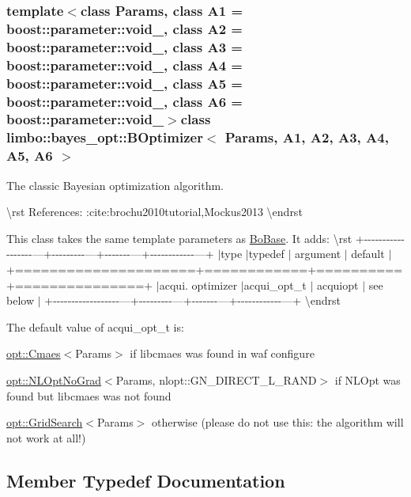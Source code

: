 \subsubsection*{template$<$class Params, class A1 = boost\+::parameter\+::void\+\_\+, class A2 = boost\+::parameter\+::void\+\_\+, class A3 = boost\+::parameter\+::void\+\_\+, class A4 = boost\+::parameter\+::void\+\_\+, class A5 = boost\+::parameter\+::void\+\_\+, class A6 = boost\+::parameter\+::void\+\_\+$>$class limbo\+::bayes\+\_\+opt\+::\+B\+Optimizer$<$ Params, A1, A2, A3, A4, A5, A6 $>$}

The classic Bayesian optimization algorithm.

\textbackslash{}rst References\+: \+:cite\+:{\ttfamily brochu2010tutorial,Mockus2013} \textbackslash{}endrst

This class takes the same template parameters as \hyperlink{classlimbo_1_1bayes__opt_1_1_bo_base}{Bo\+Base}. It adds\+: \textbackslash{}rst +-\/-\/-\/-\/-\/-\/-\/-\/-\/-\/-\/-\/-\/-\/-\/-\/-\/-\/---+-\/-\/-\/-\/-\/-\/-\/-\/-\/---+-\/-\/-\/-\/-\/-\/-\/---+-\/-\/-\/-\/-\/-\/-\/-\/-\/-\/-\/-\/---+ $\vert$type $\vert$typedef $\vert$ argument $\vert$ default $\vert$ +=====================+============+==========+===============+ $\vert$acqui. optimizer $\vert$acqui\+\_\+opt\+\_\+t $\vert$ acquiopt $\vert$ see below $\vert$ +-\/-\/-\/-\/-\/-\/-\/-\/-\/-\/-\/-\/-\/-\/-\/-\/-\/-\/---+-\/-\/-\/-\/-\/-\/-\/-\/-\/---+-\/-\/-\/-\/-\/-\/-\/---+-\/-\/-\/-\/-\/-\/-\/-\/-\/-\/-\/-\/---+ \textbackslash{}endrst

The default value of acqui\+\_\+opt\+\_\+t is\+:
\begin{DoxyItemize}
\item {\ttfamily \hyperlink{structlimbo_1_1opt_1_1_cmaes}{opt\+::\+Cmaes}$<$Params$>$} if libcmaes was found in {\ttfamily waf configure}
\item {\ttfamily \hyperlink{structlimbo_1_1opt_1_1_n_l_opt_no_grad}{opt\+::\+N\+L\+Opt\+No\+Grad}$<$Params, nlopt\+::\+G\+N\+\_\+\+D\+I\+R\+E\+C\+T\+\_\+\+L\+\_\+\+R\+A\+N\+D$>$} if N\+L\+Opt was found but libcmaes was not found
\item {\ttfamily \hyperlink{structlimbo_1_1opt_1_1_grid_search}{opt\+::\+Grid\+Search}$<$Params$>$} otherwise (please do not use this\+: the algorithm will not work at all!) 
\end{DoxyItemize}

\subsection{Member Typedef Documentation}
\hypertarget{classlimbo_1_1bayes__opt_1_1_b_optimizer_a18dc1b593c859b8f89450a31f80fb592}{}
